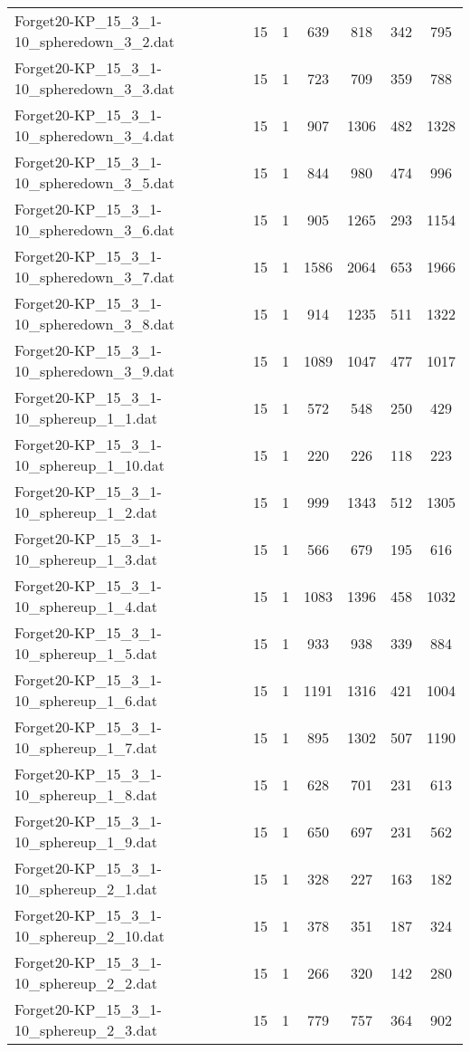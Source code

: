 \begin{table}[!ht]
\begin{tabular}{lcccccc}
Forget20-KP\_15\_3\_1-10\_spheredown\_3\_2.dat & 15 & 1 & 639 & 818 & 342 & 795 \\
Forget20-KP\_15\_3\_1-10\_spheredown\_3\_3.dat & 15 & 1 & 723 & 709 & 359 & 788 \\
Forget20-KP\_15\_3\_1-10\_spheredown\_3\_4.dat & 15 & 1 & 907 & 1306 & 482 & 1328 \\
Forget20-KP\_15\_3\_1-10\_spheredown\_3\_5.dat & 15 & 1 & 844 & 980 & 474 & 996 \\
Forget20-KP\_15\_3\_1-10\_spheredown\_3\_6.dat & 15 & 1 & 905 & 1265 & 293 & 1154 \\
Forget20-KP\_15\_3\_1-10\_spheredown\_3\_7.dat & 15 & 1 & 1586 & 2064 & 653 & 1966 \\
Forget20-KP\_15\_3\_1-10\_spheredown\_3\_8.dat & 15 & 1 & 914 & 1235 & 511 & 1322 \\
Forget20-KP\_15\_3\_1-10\_spheredown\_3\_9.dat & 15 & 1 & 1089 & 1047 & 477 & 1017 \\
Forget20-KP\_15\_3\_1-10\_sphereup\_1\_1.dat & 15 & 1 & 572 & 548 & 250 & 429 \\
Forget20-KP\_15\_3\_1-10\_sphereup\_1\_10.dat & 15 & 1 & 220 & 226 & 118 & 223 \\
Forget20-KP\_15\_3\_1-10\_sphereup\_1\_2.dat & 15 & 1 & 999 & 1343 & 512 & 1305 \\
Forget20-KP\_15\_3\_1-10\_sphereup\_1\_3.dat & 15 & 1 & 566 & 679 & 195 & 616 \\
Forget20-KP\_15\_3\_1-10\_sphereup\_1\_4.dat & 15 & 1 & 1083 & 1396 & 458 & 1032 \\
Forget20-KP\_15\_3\_1-10\_sphereup\_1\_5.dat & 15 & 1 & 933 & 938 & 339 & 884 \\
Forget20-KP\_15\_3\_1-10\_sphereup\_1\_6.dat & 15 & 1 & 1191 & 1316 & 421 & 1004 \\
Forget20-KP\_15\_3\_1-10\_sphereup\_1\_7.dat & 15 & 1 & 895 & 1302 & 507 & 1190 \\
Forget20-KP\_15\_3\_1-10\_sphereup\_1\_8.dat & 15 & 1 & 628 & 701 & 231 & 613 \\
Forget20-KP\_15\_3\_1-10\_sphereup\_1\_9.dat & 15 & 1 & 650 & 697 & 231 & 562 \\
Forget20-KP\_15\_3\_1-10\_sphereup\_2\_1.dat & 15 & 1 & 328 & 227 & 163 & 182 \\
Forget20-KP\_15\_3\_1-10\_sphereup\_2\_10.dat & 15 & 1 & 378 & 351 & 187 & 324 \\
Forget20-KP\_15\_3\_1-10\_sphereup\_2\_2.dat & 15 & 1 & 266 & 320 & 142 & 280 \\
Forget20-KP\_15\_3\_1-10\_sphereup\_2\_3.dat & 15 & 1 & 779 & 757 & 364 & 902 \\

\end{tabular}
\end{table}
